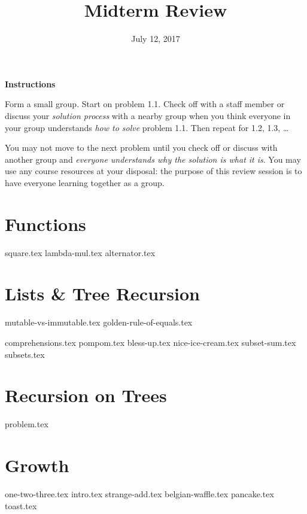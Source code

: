 \documentclass{exam}
\title{Midterm Review}
\date{July 12, 2017}
\begin{document}
\maketitle

\textbf{Instructions}

Form a small group. Start on problem 1.1. Check off with a staff member or
discuss your \emph{solution process} with a nearby group when you think everyone
in your group understands \emph{how to solve} problem 1.1. Then repeat for 1.2,
1.3, \ldots

You may not move to the next problem until you check off or discuss with another
group and \emph{everyone understands why the solution is what it is}. You may
use any course resources at your disposal: the purpose of this review session is
to have everyone learning together as a group.

\section{Functions}
\begin{questions}
{square.tex}
{lambda-mul.tex}
{alternator.tex}
\end{questions}

\section{Lists \& Tree Recursion}
{mutable-vs-immutable.tex}
{golden-rule-of-equals.tex}
\begin{questions}
{comprehensions.tex}
{pompom.tex}
{bless-up.tex}
{nice-ice-cream.tex}
{subset-sum.tex}
{subsets.tex}
\end{questions}

\section{Recursion on Trees}
\begin{questions}
{problem.tex}
\end{questions}

\section{Growth}
\begin{questions}
{one-two-three.tex}
\clearpage
{intro.tex}
{strange-add.tex}
{belgian-waffle.tex}
{pancake.tex}
{toast.tex}
\end{questions}
\end{document}
